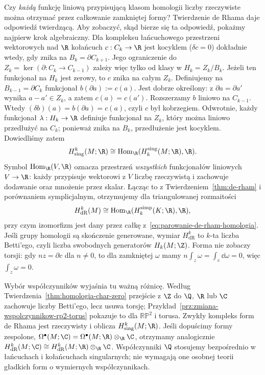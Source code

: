 Czy \emph{każdą} funkcję liniową przypisującą
klasom homologii liczby rzeczywiste można
otrzymać przez całkowanie zamkniętej formy?
Twierdzenie de Rhama daje odpowiedź twierdzącą.
Aby zobaczyć, skąd bierze się ta odpowiedź,
pokażmy najpierw krok algebraiczny.
Dla kompleksu
łańcuchowego przestrzeni wektorowych nad $\R$
kołańcuch $c:C_k\to\R$ jest kocyklem
($\delta c=0$) dokładnie wtedy, gdy znika
na $B_k=\partial C_{k+1}$. Jego ograniczenie
do $Z_k=\ker(\partial:C_k\to C_{k-1})$ zależy
więc tylko od klasy w $H_k=Z_k/B_k$.
Jeżeli ten funkcjonał na $H_k$ jest zerowy,
to $c$ znika na całym $Z_k$. Definiujemy
na $B_{k-1}=\partial C_k$ funkcjonał
$b(\partial a):=c(a)$. Jest dobrze określony:
z $\partial a=\partial a'$ wynika
$a-a'\in Z_k$, a zatem $c(a)=c(a')$.
Rozszerzamy $b$ liniowo na $C_{k-1}$.
Wtedy $(\delta b)(a)=b(\partial a)=c(a)$,
czyli $c$ był kobrzegiem. Odwrotnie, każdy
funkcjonał $\lambda:H_k\to\R$ definiuje
funkcjonał na $Z_k$, który można liniowo
przedłużyć na $C_k$; ponieważ znika na
$B_k$, przedłużenie jest kocyklem.
Dowiedliśmy zatem
\[
 H^k_{\mathrm{sing}}(M;\R)
 \cong \operatorname{Hom}_{\R}
       (H_k^{\mathrm{sing}}(M;\R),\R).
\]
Symbol $\operatorname{Hom}_{\R}(V,\R)$ oznacza
przestrzeń \emph{wszystkich} funkcjonałów liniowych
$V\to\R$: każdy przypisuje wektorowi z $V$
liczbę rzeczywistą i zachowuje dodawanie
oraz mnożenie przez skalar.
Łącząc to z Twierdzeniem~\ref{thm:de-rham}
i porównaniem symplicjalnym, otrzymujemy
dla triangulowanej rozmaitości
\begin{equation}\label{eq:porownanie-simp-de-rham}
 H^k_{\mathrm{dR}}(M)
 \cong \operatorname{Hom}_{\R}
       (H_k^{\mathrm{simp}}(K;\R),\R),
\end{equation}
przy czym izomorfizm jest dany przez całkę
z~\eqref{eq:parowanie-de-rham-homologia}.
Jeśli grupy homologii są skończenie generowane,
wymiar $H^k_{\mathrm{dR}}$ to $k$-ta liczba
Betti'ego, czyli liczba swobodnych generatorów
$H_k(M;\Z)$. Forma nie zobaczy torsji: gdy
$nz=\partial c$ dla $n\ne0$, to dla zamkniętej
$\omega$ mamy
$n\int_z\omega=\int_c\dd\omega=0$,
więc $\int_z\omega=0$.

Wybór współczynników wyjaśnia tu ważną różnicę.
Według Twierdzenia~\ref{thm:homologia-char-zero}
przejście z $\Z$ do $\Q$, $\R$ lub $\C$
zachowuje liczby Betti'ego, lecz usuwa torsję;
Przykład~\ref{prz:zmiana-wspolczynnikow-rp2-torus}
pokazuje to dla $\mathbb{RP}^2$ i torusa.
Zwykły kompleks form de Rhama jest rzeczywisty
i oblicza $H^k_{\mathrm{sing}}(M;\R)$.
Jeśli dopuścimy formy zespolone,
$\Omega^\bullet(M;\C)
=\Omega^\bullet(M;\R)\otimes_{\R}\C$,
otrzymamy analogicznie
$H^k_{\mathrm{dR}}(M;\C)
\cong H^k_{\mathrm{dR}}(M;\R)\otimes_{\R}\C$.
Współczynniki $\Q$ stosujemy bezpośrednio
w łańcuchach i kołańcuchach singularnych;
nie wymagają one osobnej teorii gładkich
form o wymiernych współczynnikach.

